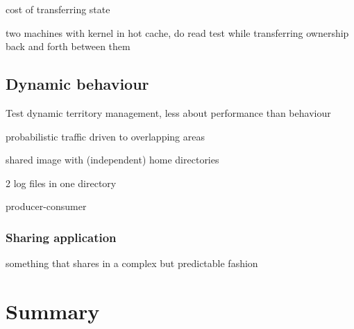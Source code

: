 cost of transferring state

two machines with kernel in hot cache, do read test while transferring ownership back and forth between them

\subsection{Dynamic behaviour}

Test dynamic territory management, less about performance than behaviour

probabilistic traffic driven to overlapping areas

shared image with (independent) home directories

2 log files in one directory

producer-consumer

\subsubsection{Sharing application}
something that shares in a complex but predictable fashion

\section{Summary}
